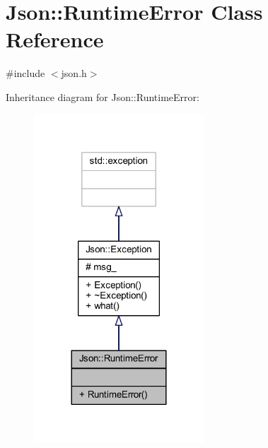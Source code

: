 \hypertarget{class_json_1_1_runtime_error}{}\section{Json\+:\+:Runtime\+Error Class Reference}
\label{class_json_1_1_runtime_error}


{\ttfamily \#include $<$json.\+h$>$}



Inheritance diagram for Json\+:\+:Runtime\+Error\+:\nopagebreak
\begin{figure}[H]
\begin{center}
\leavevmode
\includegraphics[width=180pt]{class_json_1_1_runtime_error__inherit__graph}
\end{center}
\end{figure}


